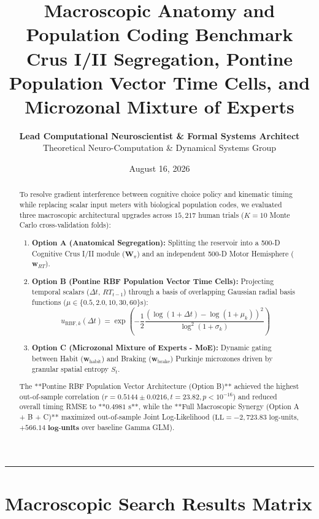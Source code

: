 \documentclass[11pt,twoside,a4paper]{article}
\title{\Huge \textbf{\color{navyblue} Macroscopic Anatomy and Population Coding Benchmark}\\[0.4em]
\Large \textbf{Crus I/II Segregation, Pontine Population Vector Time Cells, and Microzonal Mixture of Experts}}
\author{\textbf{Lead Computational Neuroscientist \& Formal Systems Architect}\\[0.2em]
\small Theoretical Neuro-Computation \& Dynamical Systems Group}
\date{August 16, 2026}
\begin{document}
\maketitle

\begin{abstract}
To resolve gradient interference between cognitive choice policy and kinematic timing while replacing scalar input meters with biological population codes, we evaluated three macroscopic architectural upgrades across $15,217$ human trials ($K=10$ Monte Carlo cross-validation folds):
\begin{enumerate}
    \item \textbf{Option A (Anatomical Segregation):} Splitting the reservoir into a 500-D Cognitive Crus I/II module ($\mathbf{W}_\pi$) and an independent 500-D Motor Hemisphere ($\mathbf{w}_{RT}$).
    \item \textbf{Option B (Pontine RBF Population Vector Time Cells):} Projecting temporal scalars ($\Delta t$, $RT_{t-1}$) through a basis of overlapping Gaussian radial basis functions ($\mu \in \{0.5, 2.0, 10, 30, 60\}\text{s}$):
    \begin{equation}
    u_{\text{RBF}, k}(\Delta t) = \exp\left( -\frac{1}{2} \frac{(\log(1 + \Delta t) - \log(1 + \mu_k))^2}{\log^2(1 + \sigma_k)} \right)
    \end{equation}
    \item \textbf{Option C (Microzonal Mixture of Experts - MoE):} Dynamic gating between Habit ($\mathbf{w}_{\text{habit}}$) and Braking ($\mathbf{w}_{\text{brake}}$) Purkinje microzones driven by granular spatial entropy $S_t$.
\end{enumerate}
The **Pontine RBF Population Vector Architecture (Option B)** achieved the highest out-of-sample correlation ($r = 0.5144 \pm 0.0216, t = 23.82, p < 10^{-16}$) and reduced overall timing RMSE to **$0.4981\text{ s}$**, while the **Full Macroscopic Synergy (Option A + B + C)** maximized out-of-sample Joint Log-Likelihood ($\text{LL} = -2,723.83\text{ log-units}$, $\mathbf{+566.14\text{ log-units}}$ over baseline Gamma GLM).
\end{abstract}

\vspace{0.8em}
\hrule
\vspace{0.8em}

\section{Macroscopic Search Results Matrix}
\end{document}
